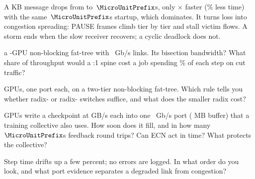 \documentclass{studysheet}
\begin{document}
\begin{rightcol}
%
  {A  KB message drops from  to \,$\MicroUnitPrefix$s, only $\times$
   faster (\% less time) with the same \,$\MicroUnitPrefix$s startup, which dominates.}{}
%
  {It turns loss into congestion spreading: PAUSE frames climb tier by tier and stall victim flows.
   A storm ends when the slow receiver recovers; a cyclic deadlock does not.}{}

\vspace{2pt}
\begin{qs}
\item \assumed{} a -GPU non-blocking fat-tree with ~Gb/s links. Its bisection
  bandwidth? What share of throughput would a :1 spine cost a job spending \% of
  each step on cut traffic?
\item \assumed{}  GPUs, one port each, on a two-tier non-blocking fat-tree. Which rule tells you whether
  radix- or radix- switches suffice, and what does the smaller radix cost?
\item \assumed{}  GPUs write a checkpoint at  GB/s each into one ~Gb/s
  port ( MB buffer) that a training collective also uses. How soon does it fill, and in how many
  \,$\MicroUnitPrefix$s feedback round trips? Can ECN act in time? What protects the collective?
\item Step time drifts up a few percent; no errors are logged. In what order do you look, and what
  port evidence separates a degraded link from congestion?
\end{qs}
\end{rightcol}
\end{document}
